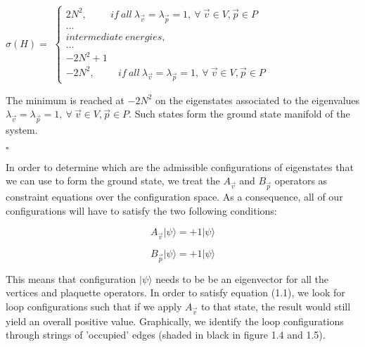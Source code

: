 \documentclass{Configuration_Files/PoliMi3i_thesis}
\begin{document}
\begin{center}
	$\sigma( H) =$
	$\begin{cases}
		2N^2, \hspace{1cm} if \ all\ \lambda_{\vec{v}}= \lambda_{\vec{p}}=1, \  \forall \ \vec{v} \in V , \vec{p} \in P\\
		\dots\\
		intermediate \ energies,\\
		\dots\\
		-2N^2+1\\
		-2N^2, \hspace{1cm} if \ all\ \lambda_{\vec{v}}= \lambda_{\vec{p}}=1, \  \forall \ \vec{v} \in V, \vec{p} \in P
	\end{cases}$
	
\end{center}

The minimum is reached at $-2N^2$ on the eigenstates  associated to the eigenvalues $\lambda_{\vec{v}}= \lambda_{\vec{p}}=1, \  \forall \ \vec{v} \in V, \vec{p} \in P$.
Such states form the ground state manifold of the system.\newline

\hfill $\square$


In order to determine which are the admissible configurations of eigenstates that we can use to form the ground state, we treat the $A_{\vec{v}} $ and $B_{\vec{p}} $ operators as constraint equations over the configuration space.
As a consequence, all of our configurations will have to satisfy the two following conditions:

\begin{equation}
	A_{\vec{v}} |\psi\rangle = +1|\psi\rangle
\end{equation}

\begin{equation}
	B_{\vec{p}} |\psi\rangle = +1|\psi\rangle
\end{equation}

This means that configuration $|\psi\rangle$ needs to be be an eigenvector for all the vertices and plaquette operators. \newline
In order to satisfy equation (1.1), we look for loop configurations such that if we apply $A_{\vec{v}} $ to that state, the result would still yield an overall positive value.\newline
Graphically, we identify the loop configurations through strings of 'occupied' edges (shaded in black in figure 1.4 and 1.5).
\end{document}
